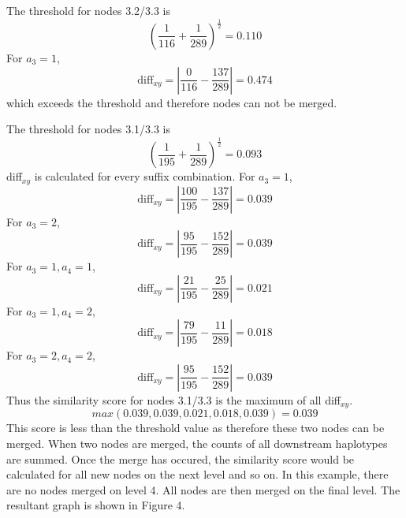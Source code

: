 \documentclass[a4paper,12pt,twoside,abstraction,titlepage]{article}
\begin{document}
The threshold for nodes 3.2/3.3 is
\vspace{-5pt}
\begin{equation*}
\left(\frac{1}{116}+\frac{1}{289}\right)^{\frac{1}{2}} = 0.110
\end{equation*}
For $a_3=1$,
\begin{equation*}
\mbox{diff}_{xy} = \left|\frac{0}{116}-\frac{137}{289}\right| = 0.474
\end{equation*}
which exceeds the threshold and therefore nodes can not be merged.

The threshold for nodes 3.1/3.3 is
\vspace{-5pt}
\begin{equation*}
\left(\frac{1}{195}+\frac{1}{289}\right)^{\frac{1}{2}} = 0.093
\end{equation*}
diff$_{xy}$ is calculated for every suffix combination. For $a_3=1$,
\begin{equation*}
\mbox{diff}_{xy} =\left|\frac{100}{195}-\frac{137}{289}\right| = 0.039 
\end{equation*}
For $a_3=2$,
\begin{equation*}
\mbox{diff}_{xy} =\left|\frac{95}{195}-\frac{152}{289}\right| = 0.039
\end{equation*}
For $a_3=1, a_4=1$,
\begin{equation*}
\mbox{diff}_{xy} =\left|\frac{21}{195}-\frac{25}{289}\right| = 0.021
\end{equation*}
For $a_3=1, a_4=2$,
\begin{equation*}
\mbox{diff}_{xy} =\left|\frac{79}{195}-\frac{11}{289}\right| = 0.018
\end{equation*}
For $a_3=2, a_4=2$,
\begin{equation*}
\mbox{diff}_{xy} =\left|\frac{95}{195}-\frac{152}{289}\right| = 0.039
\end{equation*}
Thus the similarity score for nodes 3.1/3.3 is the maximum of all diff$_{xy}$.
\begin{equation*}
max(0.039, 0.039, 0.021, 0.018, 0.039) = 0.039
\end{equation*}
This score is less than the threshold value as therefore these two nodes can be merged.  When two nodes are merged, the counts of all downstream haplotypes are summed.  Once the merge has occured, the similarity score would be calculated for all new nodes on the next level and so on.  In this example, there are no nodes merged on level 4.  All nodes are then merged on the final level.  The resultant graph is shown in Figure 4.
\end{document}
